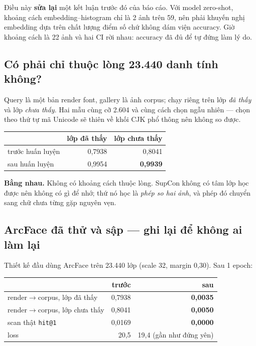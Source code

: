 \documentclass[11pt,a4paper]{article}
\newcommand{\code}[1]{\texttt{#1}}
\begin{document}
Điều này \textbf{sửa lại} một kết luận trước đó của báo cáo. Với model zero-shot, khoảng cách
embedding--histogram chỉ là 2 ảnh trên 59, nên phải khuyến nghị embedding dựa trên chất lượng điểm
số chứ không dám viện accuracy. Giờ khoảng cách là 22 ảnh và hai CI rời nhau: accuracy đã đủ để tự
đứng làm lý do.

\subsection{Có phải chỉ thuộc lòng 23.440 danh tính không?}

Query là một bản render font, gallery là ảnh corpus; chạy riêng trên lớp \emph{đã thấy} và lớp
\emph{chưa thấy}. Hai mẫu cùng cỡ 2.604 và cùng cách chọn ngẫu nhiên --- chọn theo thứ tự mã Unicode
sẽ thiên về khối CJK phổ thông nên không so được.

\begin{center}
\begin{tabular}{lrr}
\toprule
& lớp đã thấy & lớp chưa thấy \\
\midrule
trước huấn luyện & 0,7938 & 0,8041 \\
sau huấn luyện & 0,9954 & \textbf{0,9939} \\
\bottomrule
\end{tabular}
\end{center}

\textbf{Bằng nhau.} Không có khoảng cách thuộc lòng. SupCon không có tâm lớp học được nên không có
gì để nhớ; thứ nó học là \emph{phép so hai ảnh}, và phép đó chuyển sang chữ chưa từng gặp nguyên vẹn.

\subsection{ArcFace đã thử và sập --- ghi lại để không ai làm lại}
\label{sec:collapse}

Thiết kế đầu dùng ArcFace trên 23.440 lớp (scale 32, margin 0,30). Sau 1 epoch:

\begin{center}
\begin{tabular}{lrr}
\toprule
& trước & sau \\
\midrule
render$\to$corpus, lớp đã thấy & 0,7938 & \textbf{0,0035} \\
render$\to$corpus, lớp chưa thấy & 0,8041 & \textbf{0,0050} \\
scan thật \code{hit@1} & 0,0169 & \textbf{0,0000} \\
loss & 20,5 & 19,4 (gần như đứng yên) \\
\bottomrule
\end{tabular}
\end{center}
\end{document}
